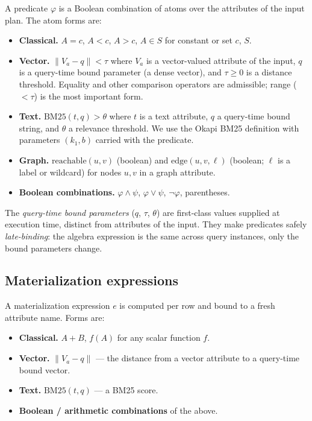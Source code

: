 \documentclass[sigconf,nonacm,review]{acmart}
\theoremstyle{plain}
\theoremstyle{definition}
\theoremstyle{remark}
\begin{document}
A predicate $\varphi$ is a Boolean combination of atoms over the
attributes of the input plan. The atom forms are:

\begin{itemize}[leftmargin=*]
  \item \textbf{Classical.} $A = c$, $A < c$, $A > c$, $A \in S$ for
    constant or set $c$, $S$.
  \item \textbf{Vector.} $\lVert V_a - q \rVert < \tau$ where $V_a$ is
    a vector-valued attribute of the input, $q$ is a query-time bound
    parameter (a dense vector), and $\tau \geq 0$ is a distance
    threshold. Equality and other comparison operators are admissible;
    range ($< \tau$) is the most important form.
  \item \textbf{Text.} $\mathrm{BM25}(t, q) > \theta$ where $t$ is a
    text attribute, $q$ a query-time bound string, and $\theta$ a
    relevance threshold. We use the Okapi BM25 definition
    \cite{bm25} with parameters $(k_1, b)$ carried with the predicate.
  \item \textbf{Graph.} $\mathrm{reachable}(u, v)$ (boolean) and
    $\mathrm{edge}(u, v, \ell)$ (boolean; $\ell$ is a label or
    wildcard) for nodes $u, v$ in a graph attribute.
  \item \textbf{Boolean combinations.} $\varphi \wedge \psi$, $\varphi
    \vee \psi$, $\neg \varphi$, parentheses.
\end{itemize}

The \emph{query-time bound parameters} ($q$, $\tau$, $\theta$) are
first-class values supplied at execution time, distinct from
attributes of the input. They make predicates safely
\emph{late-binding}: the algebra expression is the same across query
instances, only the bound parameters change.

\subsection{Materialization expressions}

A materialization expression $e$ is computed per row and bound to a
fresh attribute name. Forms are:

\begin{itemize}[leftmargin=*]
  \item \textbf{Classical.} $A + B$, $f(A)$ for any scalar function $f$.
  \item \textbf{Vector.} $\lVert V_a - q \rVert$ --- the distance from
    a vector attribute to a query-time bound vector.
  \item \textbf{Text.} $\mathrm{BM25}(t, q)$ --- a BM25 score.
  \item \textbf{Boolean / arithmetic combinations} of the above.
\end{itemize}
\end{document}
